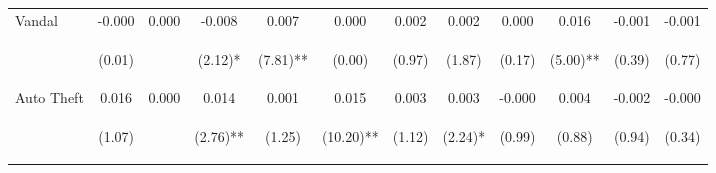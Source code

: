 \begin{tabular}{lccccccccccc}
\noalign{\smallskip}Vandal & -0.000 & 0.000 & -0.008 & 0.007 & 0.000 & 0.002 & 0.002 & 0.000 & 0.016 & -0.001 & -0.001\\
 & \begin{footnotesize}(0.01)\end{footnotesize} & \begin{footnotesize}\end{footnotesize} & \begin{footnotesize}(2.12)*\end{footnotesize} & \begin{footnotesize}(7.81)**\end{footnotesize} & \begin{footnotesize}(0.00)\end{footnotesize} & \begin{footnotesize}(0.97)\end{footnotesize} & \begin{footnotesize}(1.87)\end{footnotesize} & \begin{footnotesize}(0.17)\end{footnotesize} & \begin{footnotesize}(5.00)**\end{footnotesize} & \begin{footnotesize}(0.39)\end{footnotesize} & \begin{footnotesize}(0.77)\end{footnotesize}\\
\noalign{\smallskip}Auto Theft & 0.016 & 0.000 & 0.014 & 0.001 & 0.015 & 0.003 & 0.003 & -0.000 & 0.004 & -0.002 & -0.000\\
 & \begin{footnotesize}(1.07)\end{footnotesize} & \begin{footnotesize}\end{footnotesize} & \begin{footnotesize}(2.76)**\end{footnotesize} & \begin{footnotesize}(1.25)\end{footnotesize} & \begin{footnotesize}(10.20)**\end{footnotesize} & \begin{footnotesize}(1.12)\end{footnotesize} & \begin{footnotesize}(2.24)*\end{footnotesize} & \begin{footnotesize}(0.99)\end{footnotesize} & \begin{footnotesize}(0.88)\end{footnotesize} & \begin{footnotesize}(0.94)\end{footnotesize} & \begin{footnotesize}(0.34)\end{footnotesize}\\

\end{tabular}
